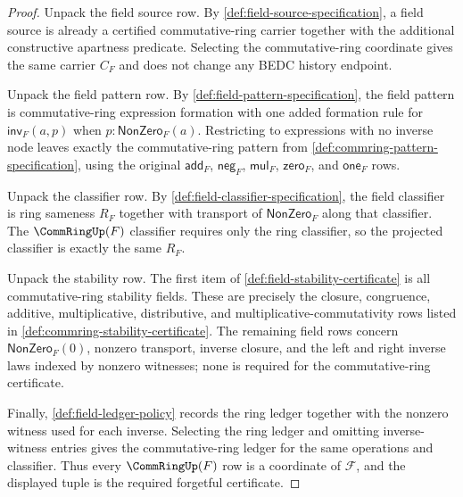 \begin{proof}
Unpack the field source row. By \autoref{def:field-source-specification}, a
field source is already a certified commutative-ring carrier together with the
additional constructive apartness predicate. Selecting the commutative-ring
coordinate gives the same carrier $C_F$ and does not change any BEDC history
endpoint.

Unpack the field pattern row. By \autoref{def:field-pattern-specification}, the
field pattern is commutative-ring expression formation with one added formation
rule for $\mathsf{inv}_F(a,p)$ when $p:\mathsf{NonZero}_F(a)$. Restricting to
expressions with no inverse node leaves exactly the commutative-ring pattern
from \autoref{def:commring-pattern-specification}, using the original
$\mathsf{add}_F$, $\mathsf{neg}_F$, $\mathsf{mul}_F$, $\mathsf{zero}_F$, and
$\mathsf{one}_F$ rows.

Unpack the classifier row. By \autoref{def:field-classifier-specification}, the
field classifier is ring sameness $R_F$ together with transport of
$\mathsf{NonZero}_F$ along that classifier. The $\CommRingUp(F)$ classifier
requires only the ring classifier, so the projected classifier is exactly the
same $R_F$.

Unpack the stability row. The first item of
\autoref{def:field-stability-certificate} is all commutative-ring stability
fields. These are precisely the closure, congruence, additive, multiplicative,
distributive, and multiplicative-commutativity rows listed in
\autoref{def:commring-stability-certificate}. The remaining field rows concern
$\mathsf{NonZero}_F(0)$, nonzero transport, inverse closure, and the left and
right inverse laws indexed by nonzero witnesses; none is required for the
commutative-ring certificate.

Finally, \autoref{def:field-ledger-policy} records the ring ledger together
with the nonzero witness used for each inverse. Selecting the ring ledger and
omitting inverse-witness entries gives the commutative-ring ledger for the same
operations and classifier. Thus every $\CommRingUp(F)$ row is a coordinate of
$\mathcal F$, and the displayed tuple is the required forgetful certificate.
\end{proof}

